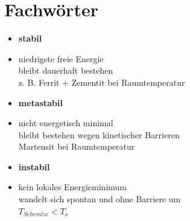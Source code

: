 \documentclass[12pt,twocolumn]{article}
\begin{document}
    \section{Fachwörter}
     \begin{minipage}[t]{0.32\columnwidth}
        \begin{itemize}[label={}, leftmargin=*, itemsep=0.01em]
            \item \textbf{stabil}
            \item niedrigste freie Energie \\ bleibt dauerhaft bestehen \\ z. B. Ferrit + Zementit bei Raumtemperatur
        \end{itemize}
    \end{minipage}\hfill
    \begin{minipage}[t]{0.32\columnwidth}
        \begin{itemize}[label={}, leftmargin=*,  itemsep=0.01em]
            \item \textbf{metastabil}
            \item nicht energetisch minimal \\ bleibt bestehen wegen kinetischer Barrieren \\ Martensit bei Raumtemperatur
        \end{itemize} 
    \end{minipage}\hfill
    \begin{minipage}[t]{0.32\columnwidth}
        \begin{itemize}[label={}, leftmargin=*, itemsep=0.01em]
            \item \textbf{instabil}
            \item kein lokales Energieminimum \\ wandelt sich spontan und ohne Barriere um \\ $T_{Schemlze} < T_s $
        \end{itemize}
    \end{minipage}\hfill
\end{document}
